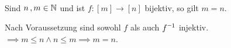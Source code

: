\documentclass[../ana1.tex]{subfiles}
\begin{document}

\begin{kor}\label{satz:schubfach:kor_2}\leavevmode \\
	Sind \(n \operatorname{,} m \in\mathbb{N} \) und ist \(f \colon [m] \longrightarrow[n] \) bijektiv, so gilt \(m = n \).
\end{kor}
\begin{bew}
	Nach Voraussetzung sind sowohl \(f \) als auch \(\inverse{f} \) injektiv. \\
	\(\implies m \leq n \wedge n \leq m \implies m = n \).
\end{bew}
\end{document}
